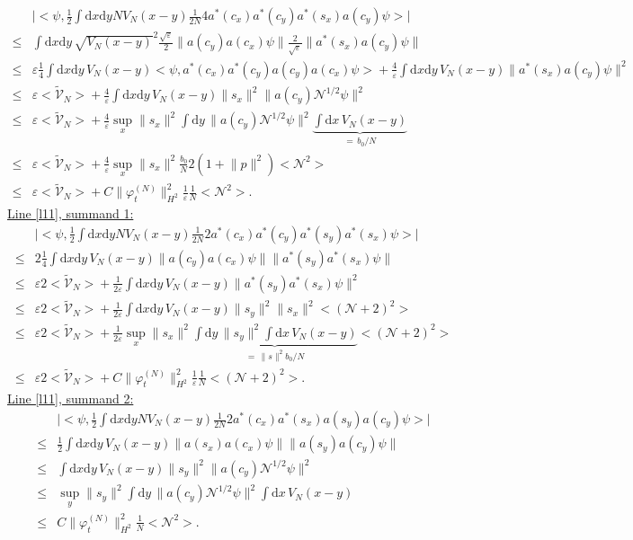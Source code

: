 \documentclass[11pt,a4paper]{scrartcl}
\newcommand{\di}{\textrm{d}}		%
\newcommand{\Ncal}{\mathcal{N}}		%
\newcommand{\tilV}{\tilde{\mathcal{V}}_N}		%
\newcommand{\estlist}[2]{\underline{Line \ref{l#1}, summand #2:}}
\newcommand{\scal}[2]{\big<#1,#2\big>} %
\newcommand{\norm}[1]{\lVert#1\rVert}	%
\newcommand{\ev}[1]{\big<#1\big>}	%
\newcommand{\ph}{\varphi_t^{(N)}}	%
\newcommand{\dxyNV}{\frac{1}{2}\int \di x\di y N V_N(x-y)} %
\begin{document}
\begin{align*}
 & \lvert \scal{\psi}{\dxyNV \frac{1}{2N} 4 a^\ast(c_x)a^\ast(c_y) a^\ast(s_x)a(c_y)\psi}\rvert \\
\leq & \int \di x\di y\, \sqrt{V_N(x-y)}^2 \frac{\sqrt{\varepsilon}}{2} \norm{a(c_y) a(c_x)\psi} \frac{2}{\sqrt{\varepsilon}} \norm{a^\ast(s_x)a(c_y)\psi} \\
\leq & \varepsilon \frac{1}{4} \int \di x\di y\, V_N(x-y) \scal{\psi}{a^\ast(c_x)a^\ast(c_y)a(c_y)a(c_x)\psi} + \frac{4}{\varepsilon} \int \di x\di y\, V_N(x-y) \norm{a^\ast(s_x)a(c_y)\psi}^2 \\
\leq & \varepsilon \ev{\tilV} + \frac{4}{\varepsilon}\int \di x\di y\, V_N(x-y) \norm{s_x}^2 \norm{a(c_y)\Ncal^{1/2}\psi}^2 \\
\leq & \varepsilon \ev{\tilV} + \frac{4}{\varepsilon} \sup_x \norm{s_x}^2 \int \di y\, \norm{a(c_y)\Ncal^{1/2}\psi}^2 \underbrace{\int \di x\, V_N(x-y)}_{=\, b_0/N} \\
\leq & \varepsilon \ev{\tilV} + \frac{4}{\varepsilon} \sup_x \norm{s_x}^2 \frac{b_0}{N} 2 (1+\norm{p}^2)\ev{\Ncal^2} \\
\leq & \varepsilon \ev{\tilV} + C\norm{\ph}_{H^2}^2 \frac{1}{\varepsilon} \frac{1}{N}\ev{\Ncal^2}.
\end{align*}
\estlist{11}{1}
\begin{align*}
& \lvert \scal{\psi}{\dxyNV \frac{1}{2N}2a^\ast(c_x)a^\ast(c_y) a^\ast(s_y) a^\ast(s_x) \psi}\rvert \\
\leq & 2\frac{1}{4}\int \di x\di y\, V_N(x-y)  \norm{a(c_y)a(c_x)\psi} \norm{a^\ast(s_y)a^\ast(s_x)\psi} \\
\leq & \varepsilon 2 \ev{\tilV} + \frac{1}{2\varepsilon} \int \di x\di y\, V_N(x-y) \norm{a^\ast(s_y)a^\ast(s_x)\psi}^2 \\
\leq & \varepsilon 2 \ev{\tilV} + \frac{1}{2\varepsilon} \int \di x\di y\, V_N(x-y) \norm{s_y}^2 \norm{s_x}^2 \ev{(\Ncal+2)^2} \\
\leq & \varepsilon 2 \ev{\tilV} + \frac{1}{2\varepsilon} \sup_x \norm{s_x}^2 \underbrace{\int \di y\, \norm{s_y}^2 \int \di x\, V_N(x-y)}_{=\, \norm{s}^2 b_0/N} \ev{(\Ncal+2)^2} \\
\leq & \varepsilon 2\ev{\tilV} + C\norm{\ph}_{H^2}^2 \frac{1}{\varepsilon} \frac{1}{N}\ev{(\Ncal+2)^2}.
\end{align*}
\estlist{11}{2}
\begin{align*}
& \lvert \scal{\psi}{\dxyNV \frac{1}{2N} 2 a^\ast(c_x) a^\ast(s_x) a(s_y) a(c_y)\psi}\rvert \\
\leq & \frac{1}{2}\int \di x\di y\, V_N(x-y) \norm{a(s_x) a(c_x) \psi} \norm{a(s_y) a(c_y)\psi} \\
\leq & \int \di x\di y\, V_N(x-y) \norm{s_y}^2 \norm{a(c_y) \Ncal^{1/2}\psi}^2\\
\leq & \sup_y \norm{s_y}^2 \int \di y\, \norm{a(c_y)\Ncal^{1/2}\psi}^2 \int \di x\, V_N(x-y)\\
\leq & C \norm{\ph}_{H^2}^2 \frac{1}{N}\ev{\Ncal^2}.
\end{align*}
\end{document}
